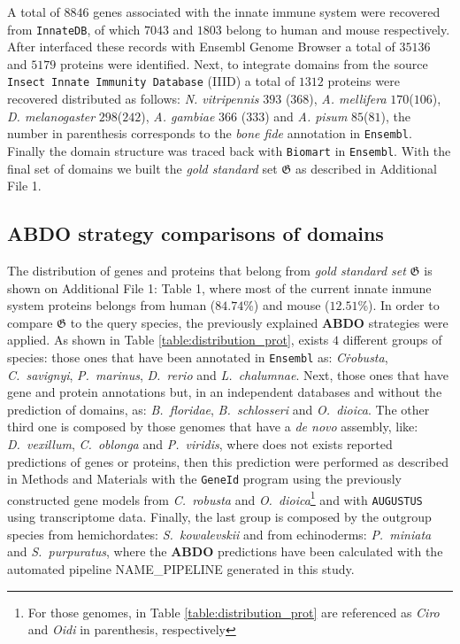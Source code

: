 \documentclass[11pt]{article}
\newcommand{\TODO}[1]{\begingroup\color{red}#1\endgroup}
\begin{document}
A total of $8846$ genes associated with the innate immune system were recovered 
from \texttt{InnateDB}, of which $7043$ and $1803$ belong to human and mouse 
respectively. After interfaced these records with Ensembl Genome Browser a total 
of $35136$ and $5179$ proteins were identified. Next, to integrate domains 
from the source \texttt{Insect Innate Immunity Database} (IIID) a total of 
$1312$ proteins were recovered distributed as follows: \textsl{N. vitripennis} 
$393$ ($368$), \textsl{A. mellifera} $170$($106$), \textsl{D. melanogaster} 
$298$($242$), \textsl{A. gambiae} $366$ ($333$) and \textsl{A. pisum} 
$85$($81$), the number in parenthesis corresponds to the \textsl{bone fide} 
annotation in \texttt{Ensembl}. Finally the domain structure was traced back 
with \texttt{Biomart} in \texttt{Ensembl}. With the final set of domains we 
built the \textsl{gold standard} set $\boldsymbol{\mathfrak{G}}$ as described 
in Additional File 1. 

\subsection*{\textbf{ABDO} strategy comparisons of domains} \label{subODB}

The distribution of genes and proteins that belong from \textsl{gold standard set} 
$\boldsymbol{\mathfrak{G}}$ is shown on Additional File 1: Table 1, where most of
the current innate inmune system proteins belongs from human ($84.74$\%) and mouse ($12.51$\%).
In order to compare $\boldsymbol{\mathfrak{G}}$ to the query species, the previously explained 
\textbf{ABDO} strategies were applied. As shown in Table \ref{table:distribution_prot}, exists 
$4$ different groups of species: those ones that have been annotated in \texttt{Ensembl} as: 
\textit{C\. robusta}, \textit{C.\ savignyi}, \textit{P.\ marinus}, \textit{D.\ rerio} 
and \textit{L.\ chalumnae}. Next, those ones that have gene and protein annotations but,
in an independent databases and without the prediction of domains, as: \textit{B.\ floridae},
\textit{B.\ schlosseri} and \textit{O.\ dioica}. The other third one is composed by those 
genomes that have a \textsl{de novo} assembly, like: \textit{D.\ vexillum}, 
\textit{C.\ oblonga} and \textit{P.\ viridis}, where does not exists reported predictions 
of genes or proteins, then this prediction were performed as described in Methods and 
Materials with the \texttt{GeneId} program using the previously constructed 
gene models from \textit{C.\ robusta} and \textit{O.\ dioica}\footnote{For 
those genomes, in Table \ref{table:distribution_prot} are referenced as 
\textsl{Ciro} and \textsl{Oidi} in parenthesis, respectively} and with 
\texttt{AUGUSTUS} using transcriptome data. Finally, the last group is composed 
by the outgroup species from hemichordates: \textit{S.\ kowalevskii} and
from echinoderms: \textit{P.\ miniata} and \textit{S.\ purpuratus}, where the \textbf{ABDO} 
predictions have been calculated with the automated pipeline \TODO{NAME\_PIPELINE} generated
in this study.
\end{document}
